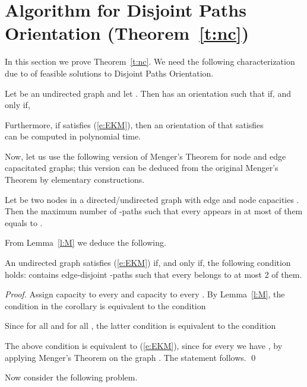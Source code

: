 \documentclass[envcountsame]{llncs}
\begin{document}
\section{Algorithm for {\sf  Disjoint Paths Orientation} (Theorem~\ref{t:nc})} \label{s:nc}

In this section we prove Theorem~\ref{t:nc}.
We need the following characterization due to \cite{EKM} 
of feasible solutions to {\sf  Disjoint Paths Orientation}.

\begin{theorem}  \label{t:EKM}
Let  be an undirected graph and let . 
Then  has an orientation  such that 
 if, and only if,

Furthermore, if  satisfies (\ref{e:EKM}), then an orientation  of 
that satisfies \\ 
 can be computed in polynomial time. 
\end{theorem}

Now, let us use the following version of Menger's Theorem for node and edge capacitated graphs;
this version can be deduced from the original Menger's Theorem by elementary constructions.

\begin{lemma} \label{l:M}
Let  be two nodes in a directed/undirected graph  with edge and node capacities 
. 
Then the maximum number of -paths such that every  
appears in at most  of them equals to
. \hfill 
\end{lemma}

From Lemma~\ref{l:M} we deduce the following.

\begin{corollary} \label{c:EKM}
An undirected graph  satisfies (\ref{e:EKM}) if, and only if, the following condition holds: 
 contains  edge-disjoint -paths such that every  
belongs to at most 2 of them.
\end{corollary}
\begin{proof}
Assign capacity  to every  and capacity  to every .
By Lemma~\ref{l:M}, the condition in the corollary is equivalent to the condition

Since  for all  and  for all , 
the latter condition is equivalent to the condition

The above condition is equivalent to (\ref{e:EKM}), since 
for every  we have 
,
by applying Menger's Theorem on the graph .
The statement follows.
\qed
\end{proof}


Now consider the following problem.
\end{document}
